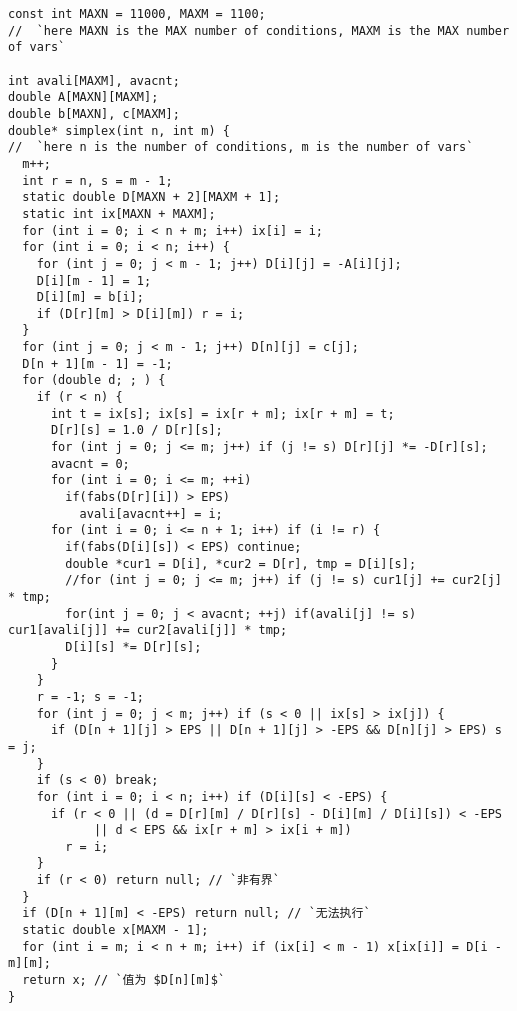 \begin{lstlisting}
const int MAXN = 11000, MAXM = 1100;
//  `here MAXN is the MAX number of conditions, MAXM is the MAX number of vars`

int avali[MAXM], avacnt;
double A[MAXN][MAXM];
double b[MAXN], c[MAXM];
double* simplex(int n, int m) {
//  `here n is the number of conditions, m is the number of vars`
  m++;
  int r = n, s = m - 1;
  static double D[MAXN + 2][MAXM + 1];
  static int ix[MAXN + MAXM];
  for (int i = 0; i < n + m; i++) ix[i] = i;
  for (int i = 0; i < n; i++) {
    for (int j = 0; j < m - 1; j++) D[i][j] = -A[i][j];
    D[i][m - 1] = 1;
    D[i][m] = b[i];
    if (D[r][m] > D[i][m]) r = i;
  }
  for (int j = 0; j < m - 1; j++) D[n][j] = c[j];
  D[n + 1][m - 1] = -1;
  for (double d; ; ) {
    if (r < n) {
      int t = ix[s]; ix[s] = ix[r + m]; ix[r + m] = t;
      D[r][s] = 1.0 / D[r][s];
      for (int j = 0; j <= m; j++) if (j != s) D[r][j] *= -D[r][s];
      avacnt = 0;
      for (int i = 0; i <= m; ++i)
        if(fabs(D[r][i]) > EPS)
          avali[avacnt++] = i;
      for (int i = 0; i <= n + 1; i++) if (i != r) {
        if(fabs(D[i][s]) < EPS) continue;
        double *cur1 = D[i], *cur2 = D[r], tmp = D[i][s];
        //for (int j = 0; j <= m; j++) if (j != s) cur1[j] += cur2[j] * tmp;
        for(int j = 0; j < avacnt; ++j) if(avali[j] != s) cur1[avali[j]] += cur2[avali[j]] * tmp;
        D[i][s] *= D[r][s];
      }
    }
    r = -1; s = -1;
    for (int j = 0; j < m; j++) if (s < 0 || ix[s] > ix[j]) {
      if (D[n + 1][j] > EPS || D[n + 1][j] > -EPS && D[n][j] > EPS) s = j;
    }
    if (s < 0) break;
    for (int i = 0; i < n; i++) if (D[i][s] < -EPS) {
      if (r < 0 || (d = D[r][m] / D[r][s] - D[i][m] / D[i][s]) < -EPS
            || d < EPS && ix[r + m] > ix[i + m])
        r = i;
    }
    if (r < 0) return null; // `非有界`
  }
  if (D[n + 1][m] < -EPS) return null; // `无法执行`
  static double x[MAXM - 1];
  for (int i = m; i < n + m; i++) if (ix[i] < m - 1) x[ix[i]] = D[i - m][m];
  return x; // `值为 $D[n][m]$`
}

\end{lstlisting}